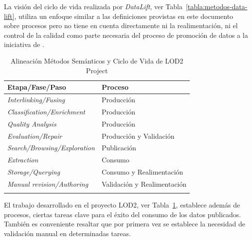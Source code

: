 La visión del ciclo de vida realizada por \textit{DataLift}, ver Tabla~\ref{tabla:metodos-data-lift}, utiliza
un enfoque similar a las definiciones provistas en este documento sobre procesos pero no tiene en cuenta directamente ni la realimentación, ni el control
de la calidad como parte necesaria del proceso de promoción de datos a la iniciativa de \linkeddata.

\begin{longtable}[c]{|p{6cm}|p{8cm}|} 

\hline
  \textbf{Etapa/Fase/Paso} &  \textbf{Proceso} \\\hline

\endhead
\textit{Interlinking/Fusing} & Producción \\ \hline
\textit{Classification/Enrichment} & Producción \\ \hline
\textit{Quality Analysis} & Producción \\ \hline
\textit{Evaluation/Repair} & Producción y Validación \\ \hline
\textit{Search/Browsing/Exploration} & Publicación \\ \hline
\textit{Extraction} & Consumo \\ \hline
\textit{Storage/Querying} & Consumo y Realimentación \\ \hline
\textit{Manual revision/Authoring} & Validación y Realimentación \\ \hline
\hline
\caption{Alineación Métodos Semánticos y Ciclo de Vida de LOD2 Project}  \label{tabla:metodos-lod2}\\    
\end{longtable}

El trabajo desarrollado en el proyecto LOD2, ver Tabla~\ref{tabla:metodos-lod2}, establece además
de procesos, ciertas tareas clave para el éxito del consumo de los datos publicados. También
es conveniente resaltar que por primera vez se establece la necesidad de validación manual en determinadas tareas.

